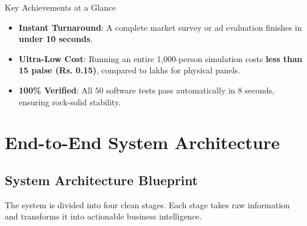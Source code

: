 \documentclass[11pt,a4paper]{article}
\begin{document}
\begin{infobox}{Key Achievements at a Glance}
\begin{itemize}[noitemsep]
  \item \textbf{Instant Turnaround}: A complete market survey or ad evaluation finishes in \textbf{under 10 seconds}.
  \item \textbf{Ultra-Low Cost}: Running an entire 1,000-person simulation costs \textbf{less than 15 paise (Rs. 0.15)}, compared to lakhs for physical panels.
  \item \textbf{100\% Verified}: All 50 software tests pass automatically in 8 seconds, ensuring rock-solid stability.
\end{itemize}
\end{infobox}

\newpage
\section{End-to-End System Architecture}

\subsection{System Architecture Blueprint}
The system is divided into four clean stages. Each stage takes raw information and transforms it into actionable business intelligence.
\end{document}
